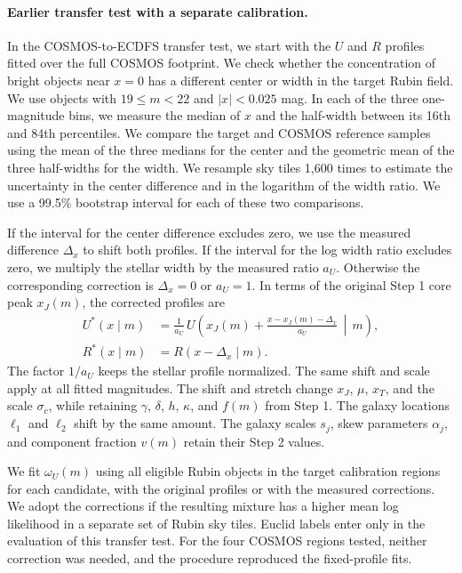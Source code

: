 \paragraph{Earlier transfer test with a separate calibration.}
In the COSMOS-to-ECDFS transfer test, we start with the \(U\) and \(R\)
profiles fitted over the full COSMOS footprint. We check whether the
concentration of bright objects near \(x=0\) has a different center or
width in the target Rubin field. We use objects with \(19\leq m<22\)
and \(|x|<0.025\) mag. In each of the three one-magnitude bins, we
measure the median of \(x\) and the half-width between its 16th and
84th percentiles. We compare the target and COSMOS reference samples
using the mean of the three medians for the center and the geometric
mean of the three half-widths for the width. We resample sky tiles 1,600
times to estimate the uncertainty in the center difference and in the
logarithm of the width ratio. We use a 99.5\% bootstrap interval for each
of these two comparisons.

If the interval for the center difference excludes zero, we use the
measured difference \(\Delta_x\) to shift both profiles. If the interval
for the log width ratio excludes zero, we multiply the stellar width
by the measured ratio \(a_U\). Otherwise the corresponding correction
is \(\Delta_x=0\) or \(a_U=1\). In terms of the original Step 1 core
peak \(x_J(m)\), the corrected profiles are
\[
 \begin{aligned}
 U^*(x\mid m)
   &=\frac{1}{a_U}\,
      U\!\left(x_J(m)+\frac{x-x_J(m)-\Delta_x}{a_U}\,\middle|\,m\right),\\
 R^*(x\mid m)&=R(x-\Delta_x\mid m).
 \end{aligned}
\]
The factor \(1/a_U\) keeps the stellar profile normalized. The same
shift and scale apply at all fitted magnitudes. The shift and stretch
change \(x_J\), \(\mu\), \(x_T\), and the
scale \(\sigma_c\), while retaining \(\gamma\), \(\delta\), \(h\),
\(\kappa\), and \(f(m)\) from Step 1. The galaxy locations
\(\ell_1\) and \(\ell_2\) shift by the same amount. The galaxy scales
\(s_j\), skew parameters \(\alpha_j\), and component fraction
\(v(m)\) retain their Step 2 values.

We fit \(\omega_U(m)\) using all eligible Rubin objects in the target
calibration regions for each candidate, with the original profiles or
with the measured corrections. We adopt the corrections if the resulting
mixture has a higher mean log likelihood in a separate set of Rubin sky
tiles. Euclid labels enter only in the evaluation of this transfer
test. For the four COSMOS regions tested, neither correction was
needed, and the procedure reproduced the fixed-profile fits.

